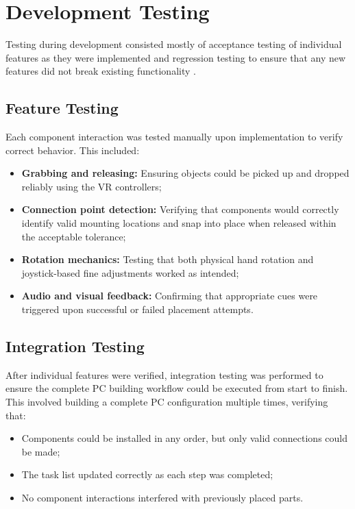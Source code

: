\section{Development Testing}

Testing during development consisted mostly of acceptance testing of individual features as they were implemented and regression testing to ensure that any new features did not break existing functionality \cite{anirbanSOFTWAREQUALITYASSURANCE2015}.

\subsection{Feature Testing}

Each component interaction was tested manually upon implementation to verify correct behavior.
This included:

\begin{itemize}
    \item \textbf{Grabbing and releasing:} Ensuring objects could be picked up and dropped reliably using the VR controllers;
    \item \textbf{Connection point detection:} Verifying that components would correctly identify valid mounting locations and snap into place when released within the acceptable tolerance;
    \item \textbf{Rotation mechanics:} Testing that both physical hand rotation and joystick-based fine adjustments worked as intended;
    \item \textbf{Audio and visual feedback:} Confirming that appropriate cues were triggered upon successful or failed placement attempts.
\end{itemize}

\subsection{Integration Testing}

After individual features were verified, integration testing was performed to ensure the complete PC building workflow could be executed from start to finish.
This involved building a complete PC configuration multiple times, verifying that:

\begin{itemize}
    \item Components could be installed in any order, but only valid connections could be made;
    \item The task list updated correctly as each step was completed;
    \item No component interactions interfered with previously placed parts.
\end{itemize}

